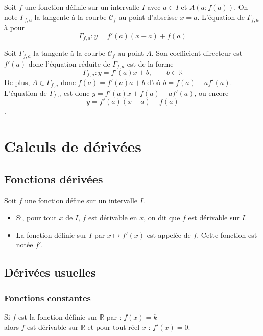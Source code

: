 \documentclass[french]{book}
\newcommand{\R}{\mathbb {R}}
\begin{document}
\begin{thm}
Soit $f$ une fonction définie sur un intervalle $I$ avec $a\in I$ et $A(a;f(a))$. On note $\Gamma_{f,a}$ la tangente à la courbe $\mathcal{C}_f$ au point d'abscisse $x=a$. 
L'équation de $\Gamma_{f,a}$ à pour  $$\Gamma_{f,a}: y=f'(a)(x-a)+f(a)$$
\end{thm}

\begin{demo}
Soit $\Gamma_{f,a}$ la tangente à la courbe $\mathcal{C}_f$ au point $A$.
Son coefficient directeur est $f'(a)$ donc l'équation réduite de $\Gamma_{f,a}$ est de la forme 
$$\Gamma_{f,a}: y=f'(a)x+b, \qquad b \in \R $$
De plus, $A\in \Gamma_{f,a}$ donc $f(a)=f'(a)a+b$ d'où $b=f(a)-af'(a)$.
L'équation de $\Gamma_{f,a}$ est donc $y=f'(a)x+f(a)-af'(a)$, ou encore $$y=f'(a)(x-a)+f(a)$$.
\end{demo}

\section{Calculs de dérivées}
\subsection{Fonctions dérivées}
\begin{defn}
Soit $f$ une fonction défine sur un intervalle $I$.
\begin{itemize}
\item Si, pour tout $x$ de $I$, $f$ est dérivable en $x$, on dit que $f$ est dérivable sur $I$.
\item La fonction définie sur $I$ par $x \longmapsto f'(x)$ est appelée  de $f$. Cette fonction est notée $f'$.
\end{itemize}
\end{defn}

\subsection{Dérivées usuelles}
\subsubsection*{Fonctions constantes}
\begin{prop}
Si $f$ est la fonction définie sur $\R$ par :  $f(x)=k$ \\
alors $f$ est dérivable sur $\R$ et pour tout réel $x$ :  $f'(x)=0$.
\end{prop}
\end{document}
